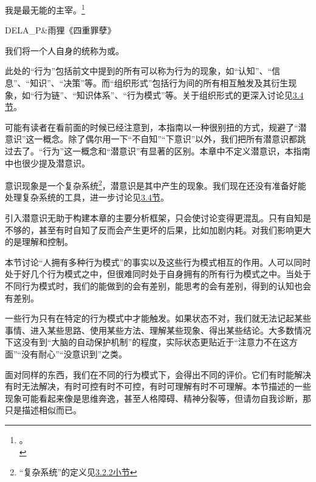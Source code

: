 \hfill\begin{minipage}{0.55\textwidth}
\fontsize{8pt}{12pt}\selectfont\fontsize{8pt}{12pt}
\raggedright 我是最无能的主宰。\footnote{\another{}\another{}。\\}

\raggedleft DELA\_P\&雨狸《四重罪孽》
\end{minipage}

\noindent 我们将一个人自身的统称为或。
\begin{explain}
此处的“行为”包括前文中提到的所有可以称为行为的现象，如“认知”、“信息”、“知识”、“决策”等。而“组织形式”包括行为间的所有相互触发及其衍生现象，如“行为链”、“知识体系”、“行为模式”等。关于组织形式的更深入讨论见\hyperref[sec:人的意识演化基本模型]{3.4节}。

可能有读者在看前面的时候已经注意到，本指南以一种很别扭的方式，规避了“潜意识”这一概念。除了偶尔用一下“不自知”“下意识”以外，我们把所有潜意识都跳过去了。“行为”这一概念和“潜意识”有显著的区别。本章中不定义潜意识，本指南中也很少提及潜意识。

意识现象是一个复杂系统\footnote{“复杂系统”的定义见\hyperref[def:复杂系统]{3.2.2小节}}，潜意识是其中产生的现象。我们现在还没有准备好能处理复杂系统的工具，进一步讨论见\hyperref[sec:人的意识演化基本模型]{3.4节}。

引入潜意识无助于构建本章的主要分析框架，只会使讨论变得更混乱。只有自知是不够的，甚至有时自知了反而会产生更坏的后果，比如加剧内耗。对我们影响更大的是理解和控制。
\end{explain}
本节讨论“人拥有多种行为模式”的事实以及这些行为模式相互的作用。人可以同时处于好几个行为模式之中，但很难同时处于自身拥有的所有行为模式之中。当处于不同行为模式时，我们的能做到的会有差别，能思考的会有差别，得到的认知也会有差别。
\begin{explain}
一些行为只有在特定的行为模式中才能触发。如果状态不对，我们就无法记起某些事情、进入某些思路、使用某些方法、理解某些现象、得出某些结论。大多数情况下这没有到“大脑的自动保护机制”的程度，实际状态更贴近于“注意力不在这方面”“没有耐心”“没意识到”之类。

面对同样的东西，我们在不同的行为模式下，会得出不同的评价。它们有时能解决有时无法解决，有时可控有时不可控，有时可理解有时不可理解。本节描述的一些现象可能看起来像是思维奔逸，甚至人格障碍、精神分裂等，但请勿自我诊断，那只是描述相似而已。
\end{explain}
